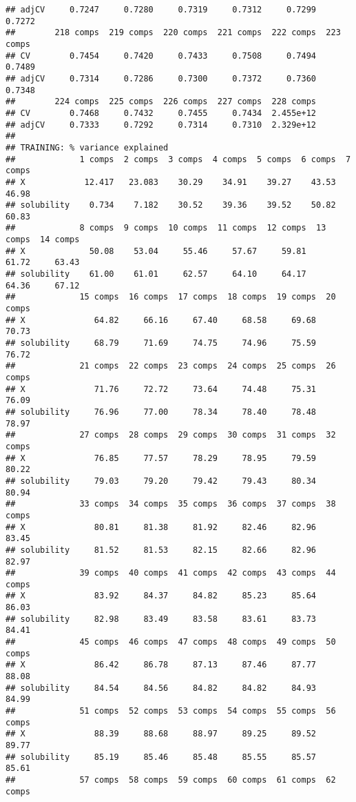 \documentclass[
]{article}
\begin{document}
\begin{verbatim}
## adjCV     0.7247     0.7280     0.7319     0.7312     0.7299     0.7272
##        218 comps  219 comps  220 comps  221 comps  222 comps  223 comps
## CV        0.7454     0.7420     0.7433     0.7508     0.7494     0.7489
## adjCV     0.7314     0.7286     0.7300     0.7372     0.7360     0.7348
##        224 comps  225 comps  226 comps  227 comps  228 comps
## CV        0.7468     0.7432     0.7455     0.7434  2.455e+12
## adjCV     0.7333     0.7292     0.7314     0.7310  2.329e+12
## 
## TRAINING: % variance explained
##             1 comps  2 comps  3 comps  4 comps  5 comps  6 comps  7 comps
## X            12.417   23.083    30.29    34.91    39.27    43.53    46.98
## solubility    0.734    7.182    30.52    39.36    39.52    50.82    60.83
##             8 comps  9 comps  10 comps  11 comps  12 comps  13 comps  14 comps
## X             50.08    53.04     55.46     57.67     59.81     61.72     63.43
## solubility    61.00    61.01     62.57     64.10     64.17     64.36     67.12
##             15 comps  16 comps  17 comps  18 comps  19 comps  20 comps
## X              64.82     66.16     67.40     68.58     69.68     70.73
## solubility     68.79     71.69     74.75     74.96     75.59     76.72
##             21 comps  22 comps  23 comps  24 comps  25 comps  26 comps
## X              71.76     72.72     73.64     74.48     75.31     76.09
## solubility     76.96     77.00     78.34     78.40     78.48     78.97
##             27 comps  28 comps  29 comps  30 comps  31 comps  32 comps
## X              76.85     77.57     78.29     78.95     79.59     80.22
## solubility     79.03     79.20     79.42     79.43     80.34     80.94
##             33 comps  34 comps  35 comps  36 comps  37 comps  38 comps
## X              80.81     81.38     81.92     82.46     82.96     83.45
## solubility     81.52     81.53     82.15     82.66     82.96     82.97
##             39 comps  40 comps  41 comps  42 comps  43 comps  44 comps
## X              83.92     84.37     84.82     85.23     85.64     86.03
## solubility     82.98     83.49     83.58     83.61     83.73     84.41
##             45 comps  46 comps  47 comps  48 comps  49 comps  50 comps
## X              86.42     86.78     87.13     87.46     87.77     88.08
## solubility     84.54     84.56     84.82     84.82     84.93     84.99
##             51 comps  52 comps  53 comps  54 comps  55 comps  56 comps
## X              88.39     88.68     88.97     89.25     89.52     89.77
## solubility     85.19     85.46     85.48     85.55     85.57     85.61
##             57 comps  58 comps  59 comps  60 comps  61 comps  62 comps

\end{verbatim}
\end{document}
